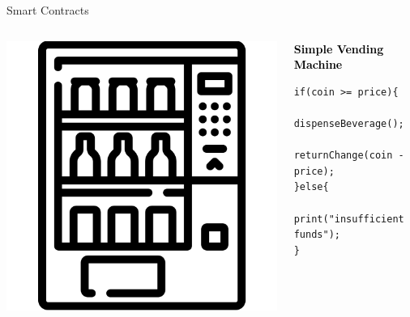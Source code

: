 \documentclass[]{beamer}
\begin{document}
\begin{frame}[fragile]{Smart Contracts}
	\begin{columns}
		\begin{column}{0.3\textwidth}
			\includegraphics[width=1\textwidth]{../assets/images/vending-machine.png}
		\end{column}
		\begin{column}{0.5\textwidth}
			\begin{block}{\textcolor{black}{\textbf{Simple Vending Machine}}}
				\begin{lstlisting}[firstnumber=1,  xleftmargin=0pt, columns=fullflexible,language=Solidity] 
if(coin >= price){
	dispenseBeverage();
	returnChange(coin - price);
}else{
	print("insufficient funds");
}
				\end{lstlisting}
			\end{block}
		\end{column}
	\end{columns}
	\vspace{0.5cm}
\end{frame}
\end{document}
